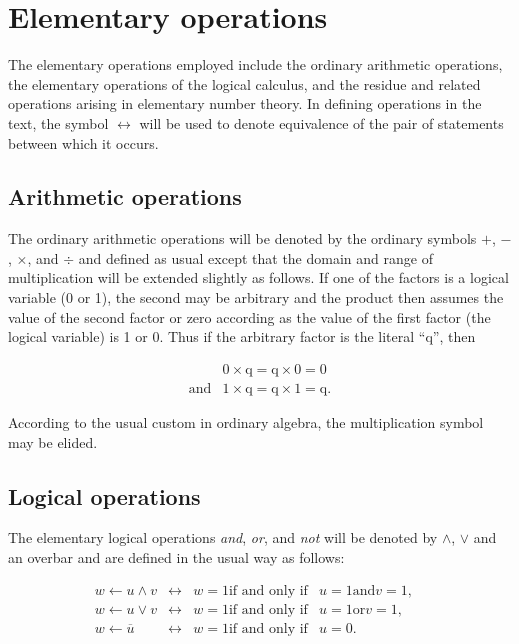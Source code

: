 \section{Elementary operations}

\par The elementary operations employed include the ordinary arithmetic operations, the elementary operations of the logical calculus, and the residue and related operations arising in elementary number theory. In defining operations in the text, the symbol $\leftrightarrow$ will be used to denote equivalence of the pair of statements between which it occurs.

\subsection*{Arithmetic operations}

The ordinary arithmetic operations will be denoted by the ordinary symbols $+$, $-$, $\times$, and $÷$ and defined as usual except that the domain and range of multiplication will be extended slightly as follows. If one of the factors is a logical variable (0 or 1), the second may be arbitrary and the product then assumes the value of the second factor or zero according as the value of the first factor (the logical variable) is 1 or 0. Thus if the arbitrary factor is the literal ``q'', then

\begin{align*}
           & 0 \times \text{q} = \text{q} \times 0 = 0 \\
\text{and} & 1 \times \text{q} = \text{q} \times 1 = \text{q}.
\end{align*}

\par According to the usual custom in ordinary algebra, the multiplication symbol may be elided.

\subsection*{Logical operations}

\par The elementary logical operations \textit{and}, \textit{or}, and \textit{not} will be denoted by $\wedge$, $\vee$ and an overbar and are defined in the usual way as follows:

\begin{align*}
 w ← u \wedge v  & \leftrightarrow & w = 1 \text{if and only if} & u = 1 \text{and} v = 1, \\
 w ← u \vee v    & \leftrightarrow & w = 1 \text{if and only if} & u = 1 \text{or} v = 1, \\
 w ← \overbar{u} & \leftrightarrow & w = 1 \text{if and only if} & u = 0. &
\end{align*}

